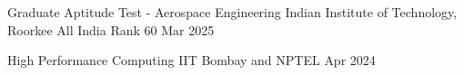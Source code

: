 \begin{cvhonors}

  \cvhonor
  {Graduate Aptitude Test - Aerospace Engineering} %
  {Indian Institute of Technology, Roorkee} %
  {All India Rank 60} %
  {Mar 2025} %

  \cvhonor
  {High Performance Computing} %
  {IIT Bombay and NPTEL} %
  {} %
  {Apr 2024} %






\end{cvhonors}
